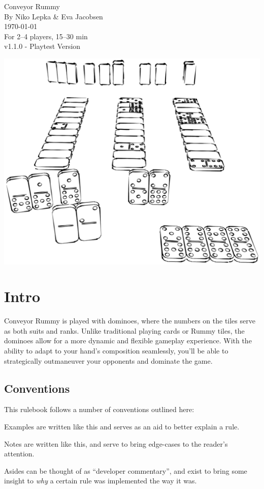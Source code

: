 


\begin{center}
  \huge Conveyor Rummy\\
  \Large By Niko Lepka \& Eva Jacobsen\\
  \normalsize \today\\
  \large For 2--4 players, 15--30 min\\
  \footnotesize v1.1.0 - Playtest Version
\end{center}

\noindent\includegraphics[width = \linewidth]{graphics/dominoes-gameplay.png}

\newpage
\section*{Intro}
Conveyor Rummy is played with dominoes, where the numbers on the tiles serve as both suits and ranks. 
Unlike traditional playing cards or Rummy tiles, the dominoes allow for a more dynamic and flexible gameplay experience. 
With the ability to adapt to your hand's composition seamlessly, you'll be able to strategically outmaneuver your opponents and dominate the game.

\subsection*{Conventions}
This rulebook follows a number of conventions outlined here:

\example Examples are written like this and serves as an aid to better explain a rule.

\note Notes are written like this, and serve to bring edge-cases to the reader's attention.

\aside Asides can be thought of as ``developer commentary'', and exist to bring some insight to \textit{why} a certain rule was implemented the way it was.
\newpage
\tableofcontents
\newpage







\newpage


